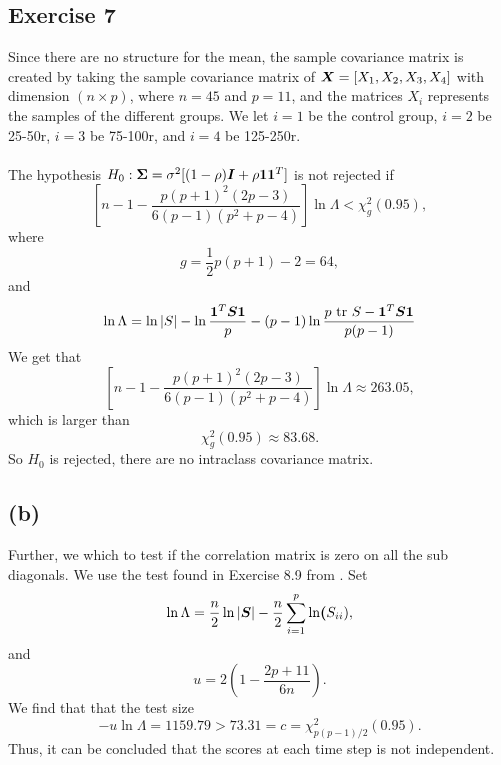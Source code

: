 
\subsection*{Exercise 7}
\label{sec:exercise-7}

Since there are no structure for the mean, the sample covariance matrix
is created by taking the sample covariance matrix of $\bm{X} = [X_{1},
X_{2}, X_{3}, X_{4}]$ with dimension $(n \times p)$, where $n = 45$ and
$p= 11$, and the matrices $X_{i}$ represents the samples of the
different groups. We let $i = 1$ be the control group, $i = 2$ be
25-50r, $i = 3$ be 75-100r, and $i = 4$ be  125-250r. \\
\\
The hypothesis $H_{0}: \bm{\Sigma} = \sigma^{2}[(1-\rho)\bm{I} + \rho \bm{1}
\bm{1}^{T}]$ is not rejected if
\begin{equation*}
  \left[ n  - 1 - \frac{p(p+1)^2 (2p-3)}{6(p-1)(p^2+p-4)} \right] \ln
    \Lambda < \chi^{2}_{g}(0.95),
\end{equation*}
where 
\begin{equation*}
  g = \frac{1}{2}p(p+1) -2 = 64,
\end{equation*}
and
\begin{equation*}
 \ln\Lambda = \ln\left| S \right|- \ln\frac{\bm{1}^{T} \bm{S} \bm{1}}{p}  - (p-1)\ln\frac{p\text{ tr } S - \bm{1}^{T} \bm{S} \bm{1}}{p(p-1)}
\end{equation*}
We get that
\begin{equation*}
  \left[ n  - 1 - \frac{p(p+1)^2 (2p-3)}{6(p-1)(p^2+p-4)} \right] \ln
    \Lambda \approx 263.05,
\end{equation*}
which is larger than
\begin{equation*}
  \chi^{2}_{g}(0.95) \approx 83.68.
\end{equation*}
So $H_{0}$ is rejected, there are no intraclass covariance matrix.

\subsection*{(b)}
\label{sec:b-6}

Further, we which to test if the correlation matrix is zero on all the
sub diagonals. We use the test found in Exercise 8.9 from \cite[p. 472]{book}. Set 
\begin{equation*}
  \ln \Lambda = \frac n2 \ln |\bm{S} |- \frac n2 \sum_{i = 1}^{p} \ln\bm{(}S_{ii}),
\end{equation*}
and 
\begin{equation*}
  u = 2\left(1 - \frac{2p + 11}{6n}\right).
\end{equation*}
We find that that the test size
\begin{equation*}
  -u \ln \Lambda = 1159.79  > 73.31 = c = \chi^2_{p(p-1)/2}(0.95).
\end{equation*}
Thus, it can be concluded that the scores at each time step is not
independent. 

